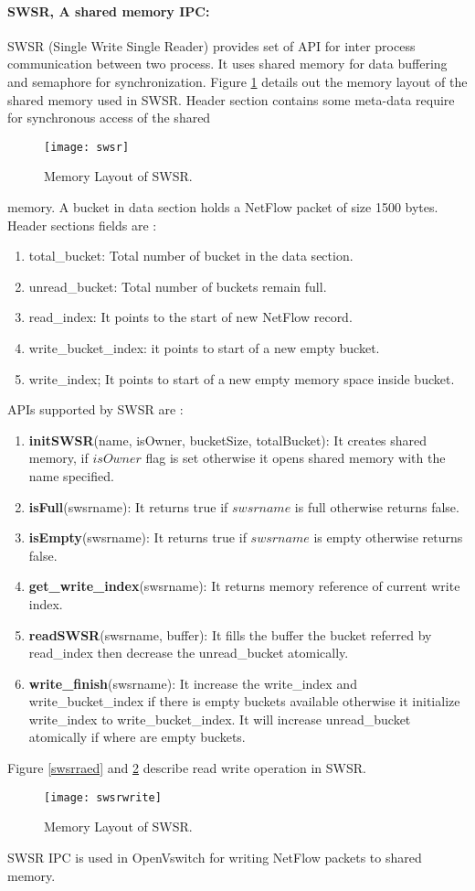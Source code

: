 	\paragraph{SWSR, A shared memory IPC:} SWSR (Single Write Single Reader) provides set of API for inter process communication 
	between two process. It uses shared memory for data buffering and semaphore for synchronization. Figure \ref{swsr} details out the
	memory layout of the shared memory used in SWSR. Header section contains some meta-data require for synchronous access of the shared 
	\begin{figure}[htb]
	      \centering
	      \texttt{[image: swsr]}
	      \caption{Memory Layout of SWSR.} 
	      \label{swsr}
	\end{figure}
	memory. A bucket in data section holds a NetFlow packet of size 1500 bytes. Header sections fields are :
	\begin{enumerate}
	 \item total\_bucket: Total number of bucket in the data section.
	 \item unread\_bucket: Total number of buckets remain full.
	 \item read\_index: It points to the start of new NetFlow record.
	 \item write\_bucket\_index: it points to start of a new empty bucket.
	 \item write\_index; It points to start of a new empty memory space inside bucket.
	\end{enumerate}
	APIs supported by SWSR are :
	\begin{enumerate}
	 \item {\bf initSWSR}(name, isOwner, bucketSize, totalBucket): It creates shared memory, if $isOwner$ flag is set otherwise it opens shared memory with the name specified.
	 \item {\bf isFull}(swsrname): It returns true if $swsrname$ is full otherwise returns false.
	 \item {\bf isEmpty}(swsrname): It returns true if $swsrname$ is empty otherwise returns false.
	 \item {\bf get\_write\_index}(swsrname): It returns memory reference of current write index.
	 \item {\bf readSWSR}(swsrname, buffer): It fills the buffer the bucket referred by read\_index then decrease the unread\_bucket atomically.
	 \item {\bf write\_finish}(swsrname): It increase the write\_index and write\_bucket\_index
	 if there is empty buckets available otherwise it initialize write\_index to write\_bucket\_index. It will increase unread\_bucket atomically if where are empty buckets. 
	\end{enumerate}
	Figure \ref{swsrraed} and \ref{swsrwrite} describe read write operation in SWSR.
	\begin{figure}[htb]
	      \centering
	      \texttt{[image: swsrwrite]}
	      \caption{Memory Layout of SWSR.} 
	      \label{swsrwrite}
	\end{figure}
	SWSR IPC is used in OpenVswitch for writing NetFlow packets to shared memory.
